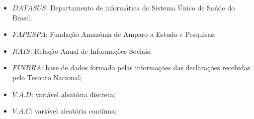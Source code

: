 \begin{refsection}
\begin{itemize}
\item $DATASUS$: Departamento de informática do Sistema Único de Saúde do Brasil; 
\item $FAPESPA$: Fundação Amazônia de Amparo a Estudo e Pesquisas;
\item $RAIS$: Relação Anual de Informações Sociais;
\item $FINBRA$:  base de dados formado pelas informações das declarações recebidas pelo Tesouro Nacional; 
 \item $V.A.D$: variável aleatória discreta;
\item $V.A.C$: variável aleatória contínua;
\end{itemize}




\printbibliography[heading=subbibliography]
\end{refsection}